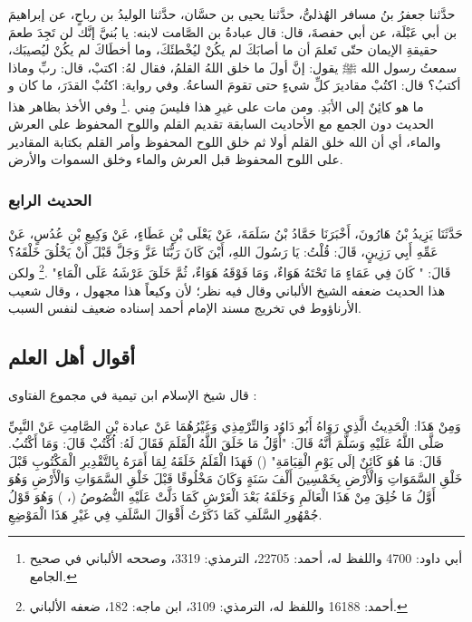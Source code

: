 حدَّثنا جعفرُ بنُ مسافر الهُذلىُّ، حدَّثنا يحيى بن حسَّان، حدَّثنا الوليدُ بن رباحٍ، عن إبراهيمَ بن أبي عَبْلَة، عن أبي حفصةَ، قال: قال عبادةُ بن الصَّامت لابنه: يا بُنيَّ إنَّك لن تَجِدَ طعمَ حقيقةِ الإيمان حتّى تَعلمَ أن ما أصابَكَ لم يكُنْ ليُخْطئَكَ، وما أخطَاكَ لم يكُنْ ليُصيبَك، سمعتُ رسول الله ﷺ يقول: إنَّ أولَ ما خلق اللهُ القلمُ، فقال لهُ: اكتبْ، قال: ربِّ وماذا أكتبُ؟ قال: اكتُبْ مقاديرَ كلِّ شيءٍ حتى تقومَ الساعةُ. وفي رواية: اكتُبْ القدَرَ، ما كان و ما هو كائِنٌ إلى الأبَدِ. ومن مات على غيرِ هذا فليسَ مِني \href{https://shamela.ws/book/117359/3975#p2}{\faExternalLink} \cite{SunanAbiDawood}.\footnote{أبي داود: 4700 واللفظ له، أحمد: 22705، الترمذي: 3319، وصححه الألباني في صحيح الجامع.} وفي الأخذ بظاهر هذا الحديث دون الجمع مع الأحاديث السابقة تقديم القلم واللوح المحفوظ على العرش والماء، أي أن الله خلق القلم أولا ثم خلق اللوح المحفوظ وأمر القلم بكتابة المقادير على اللوح المحفوظ قبل العرش والماء وخلق السموات والأرض.

\subsubsection{الحديث الرابع}
\label{sec:app_first_creation_hadith_4}

حَدَّثَنَا يَزِيدُ بْنُ هَارُونَ، أَخْبَرَنَا حَمَّادُ بْنُ سَلَمَةَ، عَنْ يَعْلَى بْنِ عَطَاءٍ، عَنْ وَكِيعِ بْنِ عُدُسٍ، عَنْ عَمِّهِ أَبِي رَزِينٍ، قَالَ: قُلْتُ: يَا رَسُولَ اللهِ، أَيْنَ كَانَ رَبُّنَا عَزَّ وَجَلَّ قَبْلَ أَنْ يَخْلُقَ خَلْقَهُ؟ قَالَ: " كَانَ فِي عَمَاءٍ مَا تَحْتَهُ هَوَاءٌ، وَمَا فَوْقَهُ هَوَاءٌ، ثُمَّ خَلَقَ عَرْشَهُ عَلَى الْمَاءِ" \href{https://shamela.ws/book/25794/12650#p1}{\faExternalLink} \cite{ahmid}.\footnote{أحمد: 16188 واللفظ له، الترمذي: 3109، ابن ماجه: 182، ضعفه الألباني.}  ولكن هذا الحديث ضعفه الشيخ الألباني وقال فيه نظر؛ لأن وكيعاً هذا مجهول \href{https://shamela.ws/book/9442/5278#p10}{\faExternalLink} \cite{albani_Sahiha}، وقال شعيب الأرناؤوط في تخريج مسند الإمام أحمد إسناده ضعيف لنفس السبب.
\subsection{أقوال أهل العلم}

قال شيخ الإسلام ابن تيمية في مجموع الفتاوى \href{https://shamela.ws/book/7289/9349#p1}{\faExternalLink}:

وَمِنْ هَذَا: الْحَدِيثُ الَّذِي رَوَاهُ أَبُو دَاوُد وَالتِّرْمِذِي وَغَيْرُهُمَا عَنْ عبادة بْنِ الصَّامِتِ عَنْ النَّبِيِّ صَلَّى اللَّهُ عَلَيْهِ وَسَلَّمَ أَنَّهُ قَالَ: "{أَوَّلُ مَا خَلَقَ اللَّهُ الْقَلَمَ فَقَالَ لَهُ: اُكْتُبْ قَالَ: وَمَا أَكْتُبُ. قَالَ: مَا هُوَ كَائِنٌ إلَى يَوْمِ الْقِيَامَةِ}" () فَهَذَا الْقَلَمُ خَلَقَهُ لِمَا أَمَرَهُ بِالتَّقْدِيرِ الْمَكْتُوبِ قَبْلَ خَلْقِ السَّمَوَاتِ وَالْأَرْضِ بِخَمْسِينَ أَلْفَ سَنَةٍ وَكَانَ مَخْلُوقًا قَبْلَ خَلْقِ السَّمَوَاتِ وَالْأَرْضِ وَهُوَ أَوَّلُ مَا خُلِقَ مِنْ هَذَا الْعَالَمِ وَخَلَقَهُ بَعْدَ الْعَرْشِ كَمَا دَلَّتْ عَلَيْهِ النُّصُوصُ (، ) وَهُوَ قَوْلُ جُمْهُورِ السَّلَفِ كَمَا ذَكَرْتُ أَقْوَالَ السَّلَفِ فِي غَيْرِ هَذَا الْمَوْضِعِ.

